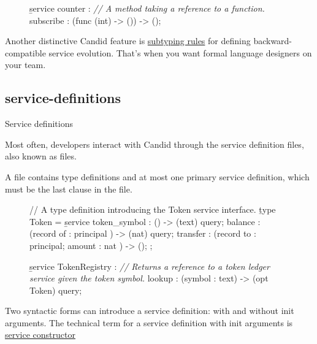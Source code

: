 \documentclass{article}
\begin{document}
\begin{figure}
\begin{code}[candid]
\b{service} counter : {
  \emph{// A method taking a reference to a function.}
  subscribe : (func (int) -> ()) -> ();
}
\end{code}
\end{figure}

Another distinctive Candid feature is \href{#subtyping}{subtyping rules} for defining backward-compatible service evolution.
That's when you want formal language designers on your team.

\subsection{service-definitions}{Service definitions}

Most often, developers interact with Candid through the service definition files, also known as \href{https://internetcomputer.org/docs/current/developer-docs/backend/candid/candid-howto#the-did-file}{} files.

A  file contains type definitions and at most one primary service definition, which must be the last clause in the  file.

\begin{figure}
\begin{code}[candid]
// A type definition introducing the Token service interface.
\b{type} Token = \b{service} {
  token_symbol : () -> (text) query;
  balance : (record { of : principal }) -> (nat) query;
  transfer : (record { to : principal; amount : nat }) -> ();
};

\b{service} TokenRegistry : {
  \emph{// Returns a reference to a token ledger service given the token symbol.}
  lookup : (symbol : text) -> (opt Token) query;
}
\end{code}
\end{figure}

Two syntactic forms can introduce a service definition: with and without init arguments.
The technical term for a service definition with init arguments is \href{https://github.com/dfinity/candid/blob/master/spec/Candid.md#services}{service constructor}
\end{document}

